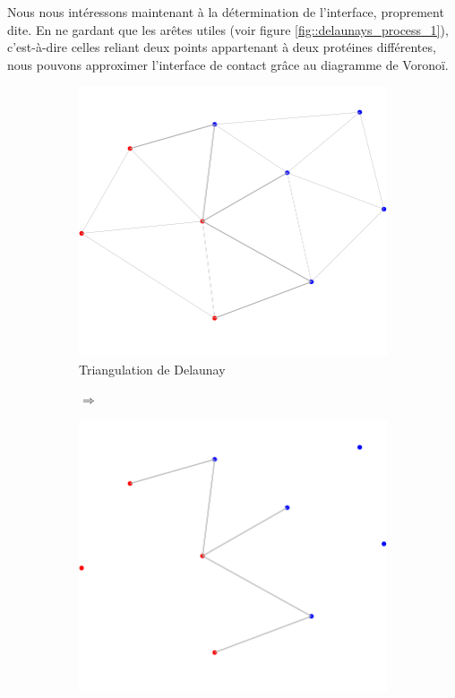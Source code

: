 Nous nous intéressons maintenant à la détermination de l'interface, proprement dite.
En ne gardant que les arêtes utiles (voir figure \ref{fig::delaunays_process_1}),
c'est-à-dire celles reliant deux points appartenant
à deux protéines différentes, nous pouvons approximer l'interface de contact grâce
au diagramme de Voronoï.

\begin{figure}[ht]
\centering
\begin{subfigure}{0.45\textwidth}
  \centering
  \includegraphics[width=\textwidth]{figures/process_d_1.png}
  \caption{Triangulation de Delaunay}
  \label{fig::process_d_1}
\end{subfigure}%
\begin{subfigure}{0.1\textwidth}
  \centering
  $\Longrightarrow$
\end{subfigure}%
\begin{subfigure}{0.45\textwidth}
  \centering
  \includegraphics[width=\textwidth]{figures/process_d_2.png}

\end{subfigure}
\end{figure}
